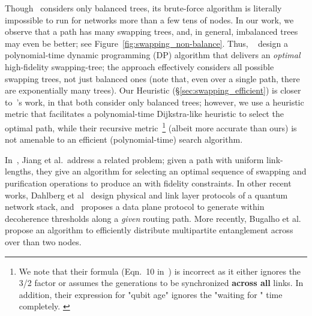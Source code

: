 Though~\cite{caleffi} considers only balanced trees, its 
brute-force algorithm is literally impossible to run for 
networks more than a few tens of nodes.
In our work, we observe that a path has many swapping trees, 
and, in general, imbalanced trees may even
be better; see Figure~\ref{fig:swapping_non-balance}. 
Thus, ~\cite{tqe22-quantum} design a polynomial-time dynamic programming (DP) algorithm that delivers 
an \textit{optimal} high-fidelity swapping-tree;
the approach effectively considers all possible swapping trees, 
not just balanced ones (note that, even over a single path, 
there are exponentially many trees). 
Our \dpalt Heuristic (\S\ref{sec:swapping_efficient}) is closer to~\cite{caleffi}'s work, 
in that both 
consider only balanced trees; however, we use a heuristic metric that facilitates a polynomial-time Dijkstra-like heuristic to select the optimal path, while their recursive metric~\footnote{We note that their formula (Eqn.~10 in~\cite{caleffi}) is incorrect as it either ignores the 3/2 factor or assumes the \eps generations to be synchronized {\bf across all} links. In addition, their expression for "qubit age" ignores the "waiting for \es" time completely. \label{ft:swapping_wrong}} 
(albeit more accurate than ours) is not amenable to an efficient (polynomial-time) search algorithm. 

In~\cite{Jiang17291}, Jiang et al.\ address a related problem; given a 
path with uniform link-lengths, they give an algorithm for selecting an 
optimal sequence of swapping and purification operations 
to produce an \eps with fidelity constraints.  
In other recent works, Dahlberg et al~\cite{sigcomm19} design physical and link layer protocols
of a quantum network stack, and~\cite{conext20} proposes a data plane protocol to generate \epss
within decoherence thresholds along a \emph{given} routing path. 
More recently, Bugalho et al.~\cite{bugalho2021distributing} propose an algorithm to efficiently distribute multipartite entanglement across over than two nodes.


